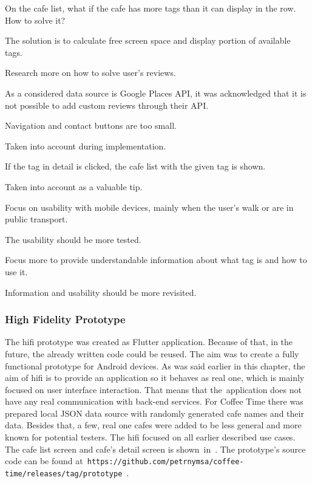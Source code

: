 \begin{questions}
  \item On the cafe list, what if the cafe has more tags than it can display in the row. How to solve it? 
         \begin{answer}
          The solution is to calculate free screen space and display portion of available tags.
         \end{answer}

  \item Research more on how to solve user's reviews.
         \begin{answer}
         As a considered data source is Google Places API, it was acknowledged that it is not possible to add custom reviews through their API.
         \end{answer}
    \item Navigation and contact buttons are too small. 
        \begin{answer}
        Taken into account during implementation.
        \end{answer}
    \item If the tag in detail is clicked, the cafe list with the given tag is shown.
        \begin{answer}
        Taken into account as a valuable tip.
        \end{answer}
    \item Focus on usability with mobile devices, mainly when the user's walk or are in public transport.
        \begin{answer}
        The usability should be more tested. 
        \end{answer}
    \item Focus more to provide understandable information about what tag is and how to use it.
     \begin{answer}
        Information and usability should be more revisited.
    \end{answer}
\end{questions}

\subsubsection{High Fidelity Prototype}
The \gls{hifi} prototype was created as Flutter application. Because of that, in the future, the already written code could be reused. The aim was to create a fully functional prototype for Android devices. As was said earlier in this chapter, the aim of \gls{hifi} is to provide an application so it behaves as real one, which is mainly focused on user interface interaction. That means that the~application does not have any real communication with back-end services. For Coffee Time there was prepared local JSON data source with randomly generated cafe names and their data. Besides that, a few, real one cafes were added to be less general and more known for potential testers. The \gls{hifi} focused on all earlier described use cases. The cafe list screen and cafe's detail screen is shown~in~. The prototype's source code can be found at~\verb|https://github.com/petrnymsa/coffee-time/releases/tag/prototype|~\cite{hifi-prototype}. 

